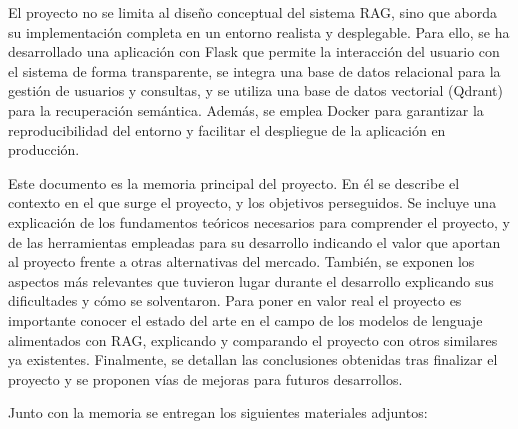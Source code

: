 El proyecto no se limita al diseño conceptual del sistema RAG, sino que aborda su implementación completa en un entorno realista y desplegable. Para ello, se ha desarrollado una aplicación  con Flask que permite la interacción del usuario con el sistema de forma transparente, se integra una base de datos relacional para la gestión de usuarios y consultas, y se utiliza una base de datos vectorial (Qdrant) para la recuperación semántica. Además, se emplea Docker para garantizar la reproducibilidad del entorno y facilitar el despliegue de la aplicación en producción.

Este documento es la memoria principal del proyecto. En él se describe el contexto en el que surge el proyecto, y los objetivos perseguidos. Se incluye una explicación de los fundamentos teóricos necesarios para comprender el proyecto, y de las herramientas empleadas para su desarrollo indicando el valor que aportan al proyecto frente a otras alternativas del mercado. También, se exponen los aspectos más relevantes que tuvieron lugar durante el desarrollo explicando sus dificultades y cómo se solventaron. Para poner en valor real el proyecto es importante conocer el estado del arte en el campo de los modelos de lenguaje alimentados con RAG, explicando y comparando el proyecto con otros similares ya existentes. Finalmente, se detallan las conclusiones obtenidas tras finalizar el proyecto y se proponen vías de mejoras para futuros desarrollos.

Junto con la memoria se entregan los siguientes materiales adjuntos:

